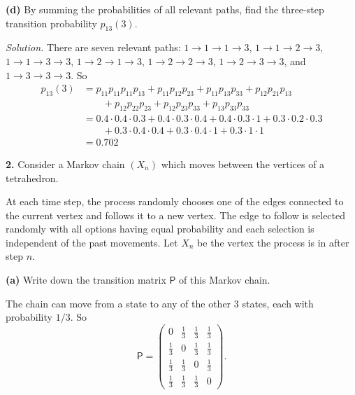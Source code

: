 \documentclass[
  a4paper,
]{article}
\theoremstyle{definition}
\theoremstyle{definition}
\theoremstyle{definition}
\theoremstyle{remark}
\begin{document}
\textbf{(d)} By summing the probabilities of all relevant paths, find the three-step transition probability \(p_{13}(3)\).

\begin{myanswers}
\emph{Solution.} There are seven relevant paths: \(1 \to 1 \to 1 \to 3\), \(1 \to 1 \to 2 \to 3\), \(1 \to 1 \to 3 \to 3\), \(1 \to 2 \to 1 \to 3\), \(1 \to 2 \to 2 \to 3\), \(1 \to 2 \to 3 \to 3\), and \(1 \to 3 \to 3 \to 3\). So
\begin{align*}
p_{13}(3) &= p_{11}p_{11}p_{11}p_{13} + p_{11}p_{12}p_{23} + p_{11}p_{13}p_{33}  + p_{12} p_{21} p_{13}\\
& \qquad{}+ p_{12}p_{22}p_{23} + p_{12}p_{23}p_{33} + p_{13}p_{33}p_{33}\\
& = 0.4 \cdot 0.4 \cdot 0.3 + 0.4\cdot 0.3\cdot 0.4 + 0.4\cdot 0.3 \cdot 1 + 0.3 \cdot 0.2 \cdot 0.3 \\
& \qquad{}+ 0.3\cdot 0.4 \cdot 0.4 + 0.3 \cdot 0.4 \cdot 1 + 0.3 \cdot 1 \cdot 1\\
&= 0.702
\end{align*}

\end{myanswers}

\textbf{2.} Consider a Markov chain \((X_n)\) which moves between the vertices of
a tetrahedron.

At each time step, the process randomly chooses one of the edges connected to the current vertex and follows it to a new vertex. The edge to follow is selected randomly with all options having equal probability and each selection is independent of the past movements. Let \(X_n\) be the vertex the process is in after step \(n\).

\textbf{(a)} Write down the transition matrix \(\mathsf P\) of this Markov chain.

\begin{myanswers}
The chain can move from a state to any of the other \(3\) states, each with probability \(1/3\). So
\[ \mathsf P = \begin{pmatrix} 0 & \frac13 & \frac13 & \frac13 \\
                               \frac13 & 0 & \frac13 & \frac13 \\
                               \frac13 & \frac13 & 0 & \frac13 \\
                               \frac13 & \frac13 & \frac13 & 0 \end{pmatrix} . \]

\end{myanswers}
\end{document}
